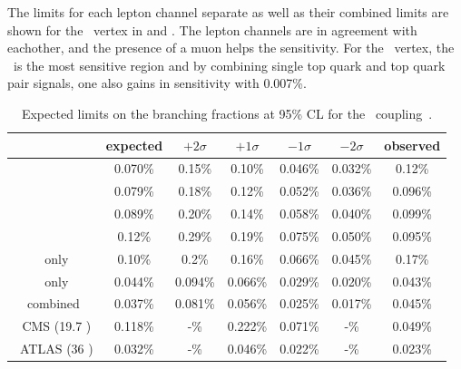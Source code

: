 The limits for each lepton channel separate as well as their combined limits are shown for the \Zct\ vertex in   and . The lepton channels are in agreement with eachother, and the presence of a muon helps the sensitivity. For the \Zct\ vertex, the \TTSR\ is the most sensitive region  and by combining single top quark and top quark pair signals, one also gains in sensitivity with 0.007\%. 

\begin{table}[htbp]
	\centering
	\caption{Expected limits on the branching fractions at 95\% CL for the \Zct\ coupling~\cite{Sirunyan:2017kkr,ATLAS-CONF-2017-070}.}
	\begin{tabular}{ccccccc}
		\toprule
		& expected & $+2\sigma$ & $+1\sigma$ & $-1\sigma$ & $-2\sigma$ & observed \\ 
		\midrule
		\mumumu\ & 0.070\% & 0.15\% & 0.10\% & 0.046\% & 0.032\% & 0.12\% \\ 
		
		\emumu\ & 0.079\% & 0.18\% & 0.12\% & 0.052\% & 0.036\% & 0.096\% \\ 
		
		\eemu\ & 0.089\% & 0.20\% & 0.14\% & 0.058\% & 0.040\% & 0.099\% \\ 
		
		\eee\ & 0.12\% & 0.29\% & 0.19\% & 0.075\% & 0.050\% & 0.095\% \B\\ 
		\hdashline
		\STSR\ only & 0.10\% & 0.2\% & 0.16\% & 0.066\% & 0.045\% & 0.17\% \T \\ 
		
		\TTSR\ only & 0.044\% & 0.094\% & 0.066\% & 0.029\% & 0.020\% & 0.043\% \B \\ 
		\hdashline 
		combined & 0.037\% & 0.081\% & 0.056\% & 0.025\% & 0.017\% & 0.045\% \T\B\\ 
		\hdashline
		8 \TeV\ CMS (19.7 \fbinv)    & 0.118\% & -\% &0.222\% & 0.071\% & -\% & 0.049\% \T\B\\
		\hdashline
		13 \TeV\ ATLAS (36 \fbinv)    & 0.032\% & -\% & 0.046\% & 0.022\%& -\% & 0.023\% \T\\
		\hline
	\end{tabular} 
	\label{tab:ResultsTZC}
\end{table}
